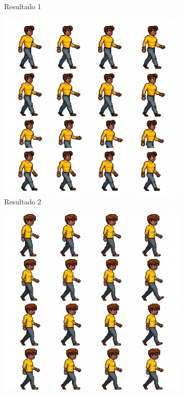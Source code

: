 \begin{figure}[htbp]
\begin{subfigure}{0.3\linewidth}
        \caption{\small Resultado 1}
        \label{fig:geminiProSheet1a}
    \end{subfigure}
    \begin{subfigure}{0.3\linewidth}
        \includegraphics[width=1\linewidth]{figs/geminiPro/chat8/tela1_res2.PNG}
        \caption{\small Resultado 2}
        \label{fig:geminiProSheet1b}
    \end{subfigure}
    \begin{subfigure}{0.3\linewidth}
        \includegraphics[width=1\linewidth]{figs/geminiPro/chat8/tela1_res3.PNG}

\end{subfigure}
\end{figure}

